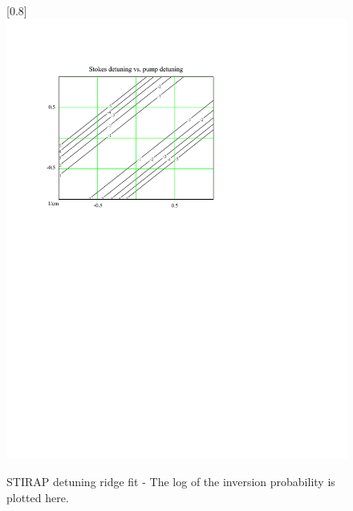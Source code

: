 \begin{figure}
\scalebox{0.8}[0.8]{
\includegraphics[bb=-30 430 489 700]
{ridge_fit/ridge_fit.pdf}
}
\caption[STIRAP detuning ridge fit]{STIRAP detuning ridge fit - The log of the inversion probability is plotted here.}
\label{ridge_fit}
\end{figure}
